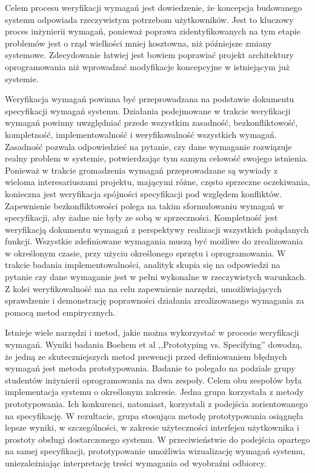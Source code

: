         Celem procesu weryfikacji wymagań jest dowiedzenie, że koncepcja budowanego systemu odpowiada rzeczywistym potrzebom użytkowników. Jest to kluczowy proces inżynierii wymagań, ponieważ poprawa zidentyfikowanych na tym etapie problemów jest o rząd wielkości mniej kosztowna, niż późniejsze zmiany systemowe. Zdecydowanie łatwiej jest bowiem poprawiać projekt architektury oprogramowania niż wprowadzać modyfikacje koncepcyjne w istniejącym już systemie. 

        Weryfikacja wymagań powinna być przeprowadzana na podstawie dokumentu specyfikacji wymagań systemu. Działania podejmowane w trakcie weryfikacji wymagań powinny uwzględniać przede wszystkim zasadność, bezkonfliktowość, kompletność, implementowalność i weryfikowalność wszystkich wymagań. Zasadność pozwala odpowiedzieć na pytanie, czy dane wymaganie rozwiązuje realny problem w systemie, potwierdzając tym samym celowość swojego istnienia. Ponieważ w trakcie gromadzenia wymagań przeprowadzane są wywiady z wieloma interesariuszami projektu, mającymi różne, często sprzeczne oczekiwania, konieczna jest weryfikacja spójności specyfikacji pod względem konfliktów. Zapewnienie bezkonfliktowości polega na takim sformułowaniu wymagań w specyfikacji, aby żadne nie były ze sobą w sprzeczności. Kompletność jest weryfikacją dokumentu wymagań z perspektywy realizacji wszystkich pożądanych funkcji. Wszystkie zdefiniowane wymagania muszą być możliwe do zrealizowania w określonym czasie, przy użyciu określonego sprzętu i oprogramowania. W trakcie badania implementowalności, analityk skupia się na odpowiedzi na pytanie czy dane wymaganie jest w pełni wykonalne w rzeczywistych warunkach. Z kolei weryfikowalność ma na celu zapewnienie narzędzi, umożliwiających sprawdzenie i demonstrację poprawności działania zrealizowanego wymagania za pomocą metod empirycznych.

        Istnieje wiele narzędzi i metod, jakie można wykorzystać w procesie weryfikacji wymagań. Wyniki badania Boehem et al ,,Prototyping vs. Specifying'' \cite{Boehm84} dowodzą, że jedną ze skuteczniejszych metod prewencji przed definiowaniem błędnych wymagań jest metoda prototypowania. Badanie to polegało na podziale grupy studentów inżynierii oprogramowania na dwa zespoły. Celem obu zespołów była implementacja systemu o określonym zakresie. Jedna grupa korzystała z metody prototypowania. Ich konkurenci, natomiast, korzystali z podejścia zorientowanego na specyfikację. W rezultacie, grupa stosująca metodę prototypowania osiągnęła lepsze wyniki, w szczególności, w zakresie użyteczności interfejsu użytkownika i prostoty obsługi dostarczonego systemu. W przeciwieństwie do podejścia opartego na samej specyfikacji, prototypowanie umożliwia wizualizację wymagań systemu, uniezależniając interpretację treści wymagania od wyobraźni odbiorcy. 

